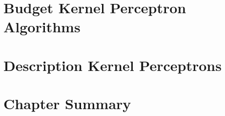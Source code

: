 \section{Budget Kernel Perceptron Algorithms}
\section{Description Kernel Perceptrons}
\section{Chapter Summary}
